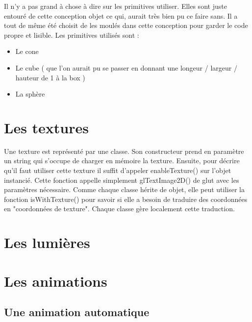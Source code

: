 \documentclass{article}
\begin{document}
Il n'y a pas grand à chose à dire sur les primitives utiliser. Elles sont juste entouré de cette conception objet ce qui, aurait très bien pu ce faire sans. Il a tout de même été choisit de les moulés dans cette conception pour garder le code propre et lisible. 
\newline
\newline
Les primitives utilisés sont : 
\begin{itemize}
	\item Le cone
	\item Le cube ( que l'on aurait pu se passer en donnant une longeur / largeur / hauteur de 1 à la box )
	\item La sphère
\end{itemize}


\section{Les textures}

Une texture est représenté par une classe. Son constructeur prend en paramètre un string qui s'occupe de charger en mémoire la texture. Ensuite, pour décrire qu'il faut utiliser cette texture il suffit d'appeler enableTexture() sur l'objet instancié. Cette fonction appelle simplement glTextImage2D() de glut avec les paramètres nécessaire.  
\newline
\newline
Comme chaque classe hérite de objet, elle peut utiliser la fonction isWithTexture() pour savoir si elle a besoin de traduire des coordonnées en "coordonnées de texture". Chaque classe gère localement cette traduction.



\section{Les lumières}


\section{Les animations}

\subsection{Une animation automatique}
\end{document}
